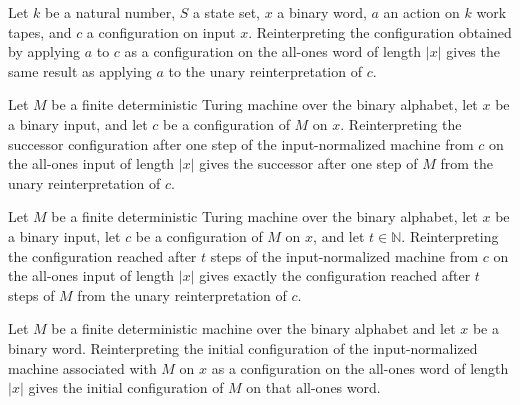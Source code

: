 \begin{lemma}
\label{Complexity.b2_unary_apply}
\leanok
{}
Let $k$ be a natural number, $S$ a state set, $x$ a binary word, $a$ an action on $k$
work tapes, and $c$ a configuration on input $x$. Reinterpreting the configuration
obtained by applying $a$ to $c$ as a configuration on the all-ones word of length $|x|$
gives the same result as applying $a$ to the unary reinterpretation of $c$.
\end{lemma}

\begin{lemma}
\label{Complexity.b2_unary_step}
\leanok
{}
Let $M$ be a finite deterministic Turing machine over the binary alphabet, let $x$ be a
binary input, and let $c$ be a configuration of $M$ on $x$. Reinterpreting the successor
configuration after one step of the input-normalized machine from $c$ on the all-ones
input of length $|x|$ gives the successor after one step of $M$ from the unary
reinterpretation of $c$.
\end{lemma}

\begin{lemma}
\label{Complexity.b2_unary_run}
\leanok
{}
Let $M$ be a finite deterministic Turing machine over the binary alphabet, let $x$ be a
binary input, let $c$ be a configuration of $M$ on $x$, and let $t\in\mathbb{N}$.
Reinterpreting the configuration reached after $t$ steps of the input-normalized machine
from $c$ on the all-ones input of length $|x|$ gives exactly the configuration reached
after $t$ steps of $M$ from the unary reinterpretation of $c$.
\end{lemma}

\begin{lemma}
\label{Complexity.b2_unary_initial}
\leanok
{}
Let $M$ be a finite deterministic machine over the binary alphabet and let $x$ be a
binary word. Reinterpreting the initial configuration of the input-normalized machine
associated with $M$ on $x$ as a configuration on the all-ones word of length $|x|$ gives
the initial configuration of $M$ on that all-ones word.
\end{lemma}

